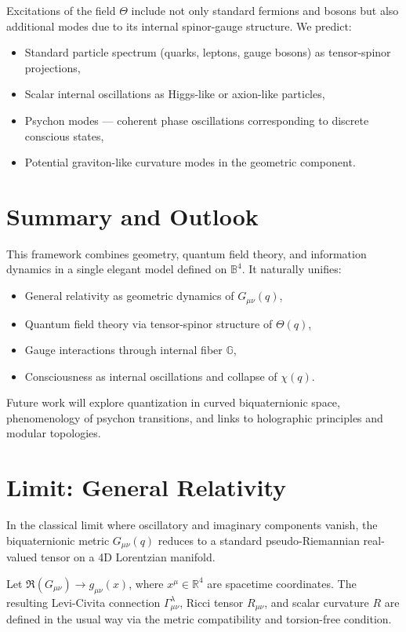 \documentclass[12pt]{article}
\begin{document}
Excitations of the field \( \Theta \) include not only standard fermions and bosons but also additional modes due to its internal spinor-gauge structure. We predict:

\begin{itemize}
  \item Standard particle spectrum (quarks, leptons, gauge bosons) as tensor-spinor projections,
  \item Scalar internal oscillations as Higgs-like or axion-like particles,
  \item Psychon modes — coherent phase oscillations corresponding to discrete conscious states,
  \item Potential graviton-like curvature modes in the geometric component.
\end{itemize}

\section{Summary and Outlook}

This framework combines geometry, quantum field theory, and information dynamics in a single elegant model defined on \( \mathbb{B}^4 \). It naturally unifies:

\begin{itemize}
  \item General relativity as geometric dynamics of \( G_{\mu\nu}(q) \),
  \item Quantum field theory via tensor-spinor structure of \( \Theta(q) \),
  \item Gauge interactions through internal fiber \( \mathbb{G} \),
  \item Consciousness as internal oscillations and collapse of \( \chi(q) \).
\end{itemize}

Future work will explore quantization in curved biquaternionic space, phenomenology of psychon transitions, and links to holographic principles and modular topologies.

\section{Limit: General Relativity}

In the classical limit where oscillatory and imaginary components vanish, the biquaternionic metric \( G_{\mu\nu}(q) \) reduces to a standard pseudo-Riemannian real-valued tensor on a 4D Lorentzian manifold.

Let \( \Re(G_{\mu\nu}) \rightarrow g_{\mu\nu}(x) \), where \( x^\mu \in \mathbb{R}^4 \) are spacetime coordinates. The resulting Levi-Civita connection \( \Gamma^\lambda_{\mu\nu} \), Ricci tensor \( R_{\mu\nu} \), and scalar curvature \( R \) are defined in the usual way via the metric compatibility and torsion-free condition.
\end{document}
